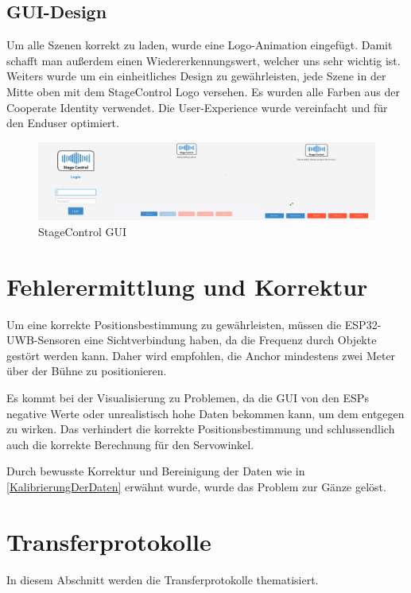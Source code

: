 \newpage
\subsection{GUI-Design}
Um alle Szenen korrekt zu laden, wurde eine Logo-Animation eingefügt. Damit schafft man außerdem einen Wiedererkennungswert, welcher uns sehr wichtig ist. Weiters wurde um ein einheitliches Design zu gewährleisten, jede Szene in der Mitte oben mit dem StageControl Logo versehen. Es wurden alle Farben aus der Cooperate Identity verwendet. Die User-Experience wurde vereinfacht und für den Enduser optimiert.   

\begin{figure}[H]
	\centering
	\includegraphics[width=0.9\linewidth]{images/stagecontrol.png}
	\caption[StageControl GUI]{StageControl GUI}
	\label{fig:StageControlGUI}
\end{figure}

\section{Fehlerermittlung und Korrektur}
Um eine korrekte Positionsbestimmung zu gewährleisten, müssen die ESP32-UWB-Sensoren eine Sichtverbindung haben, da die Frequenz durch Objekte gestört werden kann. Daher wird empfohlen, die Anchor mindestens zwei Meter über der Bühne zu positionieren.

Es kommt bei der Visualisierung zu Problemen, da die GUI von den ESPs negative Werte oder unrealistisch hohe Daten bekommen kann, um dem entgegen zu wirken. Das verhindert die korrekte Positionsbestimmung und schlussendlich auch die korrekte Berechnung für den Servowinkel. 

Durch bewusste Korrektur und Bereinigung der Daten wie in \ref{KalibrierungDerDaten} erwähnt wurde, wurde das Problem zur Gänze gelöst.

\section{Transferprotokolle}
In diesem Abschnitt werden die Transferprotokolle thematisiert.

